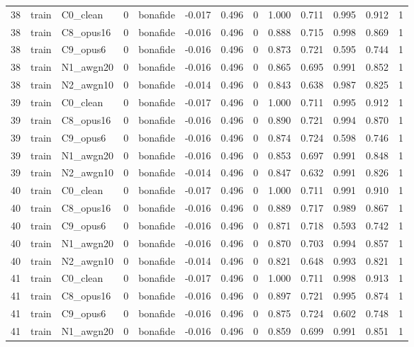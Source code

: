 \begin{tabular}{rllrlrrrrrrrr}
38 & train & C0_clean & 0 & bonafide & -0.017 & 0.496 & 0 & 1.000 & 0.711 & 0.995 & 0.912 & 1 \\
38 & train & C8_opus16 & 0 & bonafide & -0.016 & 0.496 & 0 & 0.888 & 0.715 & 0.998 & 0.869 & 1 \\
38 & train & C9_opus6 & 0 & bonafide & -0.016 & 0.496 & 0 & 0.873 & 0.721 & 0.595 & 0.744 & 1 \\
38 & train & N1_awgn20 & 0 & bonafide & -0.016 & 0.496 & 0 & 0.865 & 0.695 & 0.991 & 0.852 & 1 \\
38 & train & N2_awgn10 & 0 & bonafide & -0.014 & 0.496 & 0 & 0.843 & 0.638 & 0.987 & 0.825 & 1 \\
39 & train & C0_clean & 0 & bonafide & -0.017 & 0.496 & 0 & 1.000 & 0.711 & 0.995 & 0.912 & 1 \\
39 & train & C8_opus16 & 0 & bonafide & -0.016 & 0.496 & 0 & 0.890 & 0.721 & 0.994 & 0.870 & 1 \\
39 & train & C9_opus6 & 0 & bonafide & -0.016 & 0.496 & 0 & 0.874 & 0.724 & 0.598 & 0.746 & 1 \\
39 & train & N1_awgn20 & 0 & bonafide & -0.016 & 0.496 & 0 & 0.853 & 0.697 & 0.991 & 0.848 & 1 \\
39 & train & N2_awgn10 & 0 & bonafide & -0.014 & 0.496 & 0 & 0.847 & 0.632 & 0.991 & 0.826 & 1 \\
40 & train & C0_clean & 0 & bonafide & -0.017 & 0.496 & 0 & 1.000 & 0.711 & 0.991 & 0.910 & 1 \\
40 & train & C8_opus16 & 0 & bonafide & -0.016 & 0.496 & 0 & 0.889 & 0.717 & 0.989 & 0.867 & 1 \\
40 & train & C9_opus6 & 0 & bonafide & -0.016 & 0.496 & 0 & 0.871 & 0.718 & 0.593 & 0.742 & 1 \\
40 & train & N1_awgn20 & 0 & bonafide & -0.016 & 0.496 & 0 & 0.870 & 0.703 & 0.994 & 0.857 & 1 \\
40 & train & N2_awgn10 & 0 & bonafide & -0.014 & 0.496 & 0 & 0.821 & 0.648 & 0.993 & 0.821 & 1 \\
41 & train & C0_clean & 0 & bonafide & -0.017 & 0.496 & 0 & 1.000 & 0.711 & 0.998 & 0.913 & 1 \\
41 & train & C8_opus16 & 0 & bonafide & -0.016 & 0.496 & 0 & 0.897 & 0.721 & 0.995 & 0.874 & 1 \\
41 & train & C9_opus6 & 0 & bonafide & -0.016 & 0.496 & 0 & 0.875 & 0.724 & 0.602 & 0.748 & 1 \\
41 & train & N1_awgn20 & 0 & bonafide & -0.016 & 0.496 & 0 & 0.859 & 0.699 & 0.991 & 0.851 & 1 \\

\end{tabular}
